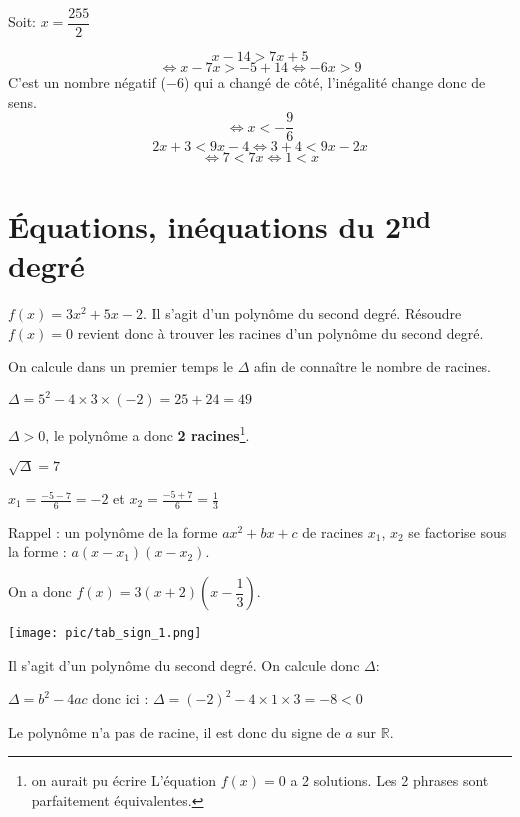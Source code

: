 \documentclass[a4paper,11pt]{scrartcl}
\begin{document}
Soit: $x = \dfrac{255}{2}$






$$x-14 > 7x+5$$
$$\Leftrightarrow x-7x > -5+14 \Leftrightarrow -6x > 9$$
C'est un nombre négatif ($-6$) qui a changé de côté, l'inégalité change donc de sens.
$$\Leftrightarrow x < -\frac{9}{6}$$
\trait
$$2x + 3 < 9x - 4 \Leftrightarrow 3+4 < 9x - 2x$$
$$\Leftrightarrow 7 < 7x \Leftrightarrow 1 < x$$


\section{Équations, inéquations du 2\textsuperscript{nd} degré}


$f(x) = 3x^2 + 5x - 2$. Il s'agit d'un polynôme du second degré. Résoudre $f(x) = 0$ revient donc à trouver les racines d'un polynôme du second degré.

On calcule dans un premier temps le $\Delta$ afin de connaître le nombre de racines.

$\Delta = 5^2 - 4 \times 3 \times (-2) = 25 + 24 = 49$


$\Delta > 0$, le polynôme a donc \textbf{2 racines}\footnote{on aurait pu écrire \og L'équation $f(x) = 0$ a 2 solutions. \fg{} Les 2 phrases sont parfaitement équivalentes.}.

$\sqrt{\Delta} = 7$

$x_1 = \frac{-5-7}{6} = -2$ et 
$x_2 = \frac{-5+7}{6} = \frac{1}{3}$


Rappel : un polynôme de la forme $ax^2 + bx + c$ de racines $x_1$, $x_2$ se factorise sous la forme : $a(x-x_1)(x-x_2)$.

On a donc $f(x) = 3(x+2)\left(x-\dfrac{1}{3}\right)$.


\texttt{[image: pic/tab\_sign\_1.png]}


Il s'agit d'un polynôme du second degré. On calcule donc $\Delta$: %

$\Delta = b^2 - 4ac$ donc ici : $\Delta = (-2)^2 - 4 \times 1 \times 3 = -8 < 0$

Le polynôme n'a pas de racine, il est donc du signe de $a$ sur $\mathbb{R}$.
\end{document}
